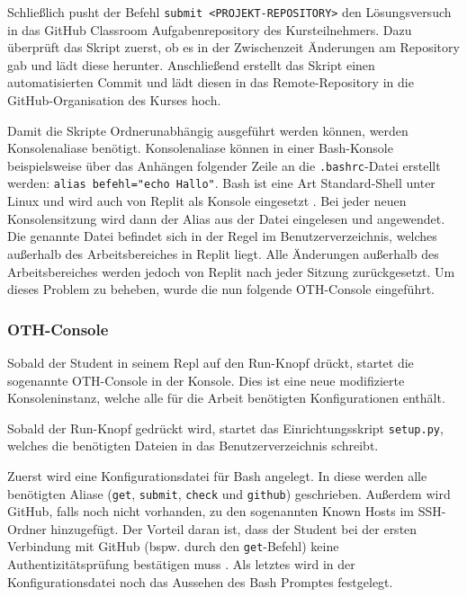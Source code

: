 Schließlich pusht der Befehl \texttt{submit <PROJEKT-REPOSITORY>}
den Lösungsversuch in das GitHub Classroom Aufgabenrepository des
Kursteilnehmers. Dazu überprüft das Skript zuerst, ob es in der Zwischenzeit
Änderungen am Repository gab und lädt diese herunter. Anschließend erstellt
das Skript einen automatisierten Commit und lädt diesen in das Remote-Repository
in die GitHub-Organisation des Kurses hoch.

Damit die Skripte Ordnerunabhängig ausgeführt werden können, werden
Konsolenaliase benötigt. Konsolenaliase können in einer Bash-Konsole
beispielsweise über das Anhängen folgender Zeile an die \texttt{.bashrc}-Datei
erstellt werden: \texttt{alias befehl="echo Hallo"}. Bash ist eine Art
\glqq Standard-Shell\grqq{} unter Linux und wird auch von Replit als Konsole
eingesetzt \parencite{bash}. Bei jeder neuen Konsolensitzung wird dann der Alias aus
der Datei eingelesen und angewendet. Die genannte Datei befindet sich in der
Regel im Benutzerverzeichnis, welches außerhalb des Arbeitsbereiches in Replit
liegt. Alle Änderungen außerhalb des Arbeitsbereiches werden jedoch von Replit
nach jeder Sitzung zurückgesetzt. Um dieses Problem zu beheben, wurde die nun
folgende OTH-Console eingeführt.

\subsubsection{OTH-Console}\label{replit-template-oth-console}
Sobald der Student in seinem Repl auf den Run-Knopf drückt, startet die
sogenannte OTH-Console in der Konsole. Dies ist eine neue
modifizierte Konsoleninstanz, welche alle für die Arbeit benötigten
Konfigurationen enthält.

Sobald der Run-Knopf gedrückt wird, startet das Einrichtungsskript
\texttt{setup.py}, welches die benötigten Dateien in das Benutzerverzeichnis
schreibt.

Zuerst wird eine Konfigurationsdatei für Bash angelegt. In diese
werden alle benötigten Aliase (\texttt{get}, \texttt{submit}, \texttt{check}
und \texttt{github}) geschrieben. Außerdem wird GitHub, falls noch
nicht vorhanden, zu den sogenannten \glqq Known Hosts\grqq{} im SSH-Ordner
hinzugefügt. Der Vorteil daran ist, dass der Student bei der ersten Verbindung
mit GitHub (bspw. durch den \texttt{get}-Befehl) keine Authentizitätsprüfung
bestätigen muss \parencite{ssh}. Als letztes wird in der Konfigurationsdatei noch das
Aussehen des Bash Promptes festgelegt.

